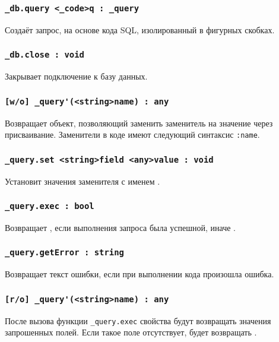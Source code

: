 \subsubsection{\lstinline|_db.query <_code>q : _query|}

Создаёт запрос, на основе кода SQL, изолированный в фигурных скобках.

\subsubsection{\lstinline|_db.close : void|}

Закрывает подключение к базу данных.

\subsubsection{\lstinline|[w/o] _query'(<string>name) : any|}

Возвращает объект, позволяющий заменить заменитель на значение через присваивание. Заменители в коде имеют следующий синтаксис \lstinline|:name|.

\subsubsection{\lstinline|_query.set <string>field <any>value : void|}

Установит значения заменителя с именем .

\subsubsection{\lstinline|_query.exec : bool|}

Возвращает \true, если выполнения запроса была успешной, иначе \false.

\subsubsection{\lstinline|_query.getError : string|}

Возвращает текст ошибки, если при выполнении кода произошла ошибка.

\subsubsection{\lstinline|[r/o] _query'(<string>name) : any|}

После вызова функции \lstinline|_query.exec| свойства будут возвращать значения запрошенных полей. Если такое поле отсутствует, будет возвращать \void.

